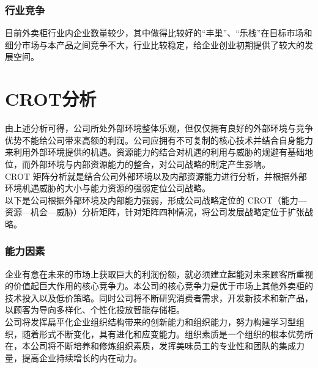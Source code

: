 \documentclass[violet]{main}
\begin{document}
			\subsubsection{行业竞争}
				目前外卖柜行业内企业数量较少，其中做得比较好的“丰巢”、“乐栈”在目标市场和细分市场与本产品之间竞争不大，行业比较稳定，给企业创业初期提供了较大的发展空间。
				\begin{center}
					\Tcbset
				\end{center}
		\section{CROT分析}
			由上述分析可得，公司所处外部环境整体乐观，但仅仅拥有良好的外部环境与竞争优势不能给公司带来高额的利润。公司应拥有不可复制的核心技术并结合自身能力来利用外部环境提供的机遇。资源能力的结合对机遇的利用与威胁的规避有基础地位，而外部环境与内部资源能力的整合，对公司战略的制定产生影响。
			\\\indent CROT 矩阵分析就是结合公司外部环境以及内部资源能力进行分析，并根据外部环境机遇威胁的大小与能力资源的强弱定位公司战略。
			\\\indent 以下是公司根据外部环境及内部能力强弱，形成公司战略定位的 CROT（能力—资源—机会—威胁）分析矩阵，针对矩阵四种情况，将公司发展战略定位于扩张战略。
			\subsubsection{能力因素}
				企业有意在未来的市场上获取巨大的利润份额，就必须建立起能对未来顾客所重视的价值起巨大作用的核心竞争力。本公司的核心竞争力是优于市场上其他外卖柜的技术投入以及低价策略。同时公司将不断研究消费者需求，开发新技术和新产品，以顾客为导向多样化、个性化投放智能存储柜。
				\\\indent 公司将发挥扁平化企业组织结构带来的创新能力和组织能力，努力构建学习型组织，随着形式不断变化，具有进化和应变能力。组织素质是一个组织的根本优势所在，本公司将不断培养和修炼组织素质，发挥美味员工的专业性和团队的集成力量，提高企业持续增长的内在动力。
\end{document}

